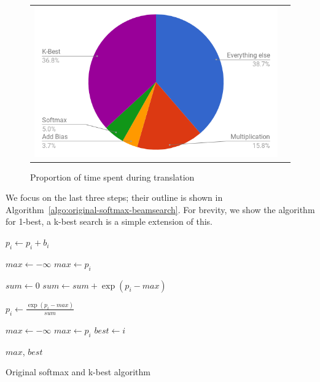 \documentclass[11pt,a4paper]{article}
\begin{document}
\begin{figure}
\centering
\begin{tabular}{cc}
{\includegraphics[scale=0.35]{pie-time.png}} 
\end{tabular}
\caption{Proportion of time spent during translation}
\label{fig:pie-time}
\end{figure} 

We focus on the last three steps; their outline is shown in Algorithm~\ref{algo:original-softmax-beamsearch}. For brevity, we show the algorithm for 1-best, a k-best search is a simple extension of this.

\begin{algorithm} 
\begin{algorithmic}

  \State $p_i \gets p_i + b_i$
\EndFor 
\EndProcedure

\State


\State $max \gets - \infty$ 
    \State $max \gets p_i$
  \EndIf
\EndFor

\State $sum \gets 0$ 
  \State $sum \gets sum + \exp(p_i - max)$
\EndFor

  \State $p_i \gets \frac{\exp(p_i - max)}{sum} $
\EndFor 

\EndProcedure

\State


\State $max \gets - \infty$ 
    \State $max \gets p_i$
    \State $best \gets i$
  \EndIf
\EndFor 

\Return $max$, $best$

\EndProcedure

\end{algorithmic}
\caption{Original softmax and k-best algorithm}
\label{algo:original-softmax-beamsearch}
\end{algorithm}
\end{document}
